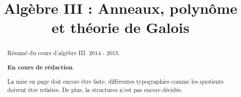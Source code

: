 \documentclass[a4paper, 12pt]{report}
\title{Algèbre III : Anneaux, polynôme et théorie de Galois}
\author{}
\begin{document}
\maketitle
\begin{abstract}
	Résumé du cours d'algèbre III. 2014 - 2015.
	
	\textbf{En cours de rédaction}.
	
	La mise en page doit encore être faite, différentes typographies comme les
	quotients doivent être refaites. De plus, la structures n'est pas encore
	décidée.
\end{abstract}
\tableofcontents



\end{document}
